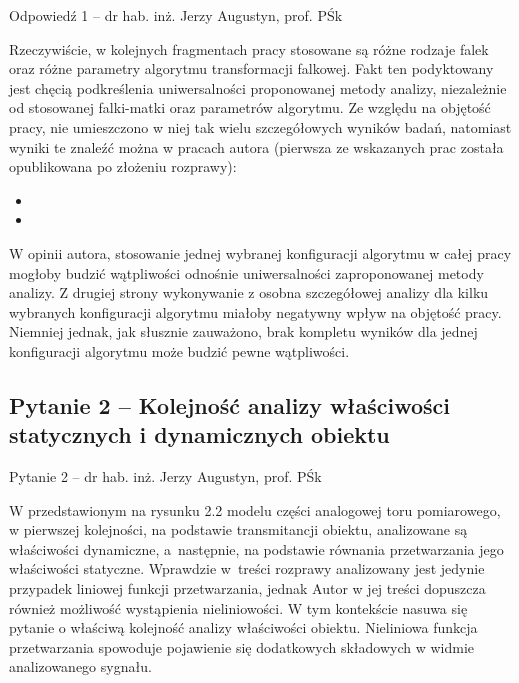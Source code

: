 \documentclass[12pt, polish, aspectratio = 169]{slides}
\begin{document}
\begin{frame}[allowframebreaks]{Odpowiedź 1 -- dr hab. inż. Jerzy Augustyn, prof. PŚk}\small
\begin{justify}
Rzeczywiście, w kolejnych fragmentach pracy stosowane są różne rodzaje falek oraz różne parametry algorytmu transformacji falkowej. Fakt ten podyktowany jest chęcią podkreślenia uniwersalności proponowanej metody analizy, niezależnie od stosowanej falki-matki oraz parametrów algorytmu. Ze względu na objętość pracy, nie umieszczono w niej tak wielu szczegółowych wyników badań, natomiast wyniki te znaleźć można w pracach autora (pierwsza ze wskazanych prac została opublikowana po złożeniu rozprawy):

\begin{itemize}
\item {}
\item {}
\end{itemize}

W opinii autora, stosowanie jednej wybranej konfiguracji algorytmu w całej pracy mogłoby budzić wątpliwości odnośnie uniwersalności zaproponowanej metody analizy. Z drugiej strony wykonywanie z osobna szczegółowej analizy dla kilku wybranych konfiguracji algorytmu miałoby negatywny wpływ na objętość pracy. Niemniej jednak, jak słusznie zauważono, brak kompletu wyników dla jednej konfiguracji algorytmu może budzić pewne wątpliwości.
\end{justify}
\end{frame}

\subsection{Pytanie 2 -- Kolejność analizy właściwości statycznych i dynamicznych obiektu}

\begin{frame}{Pytanie 2 -- dr hab. inż. Jerzy Augustyn, prof. PŚk}\large
\begin{justify}
W przedstawionym na rysunku 2.2 modelu części analogowej toru pomiarowego, w pierwszej kolejności, na podstawie transmitancji obiektu, analizowane są właściwości dynamiczne, a następnie, na podstawie równania przetwarzania jego właściwości statyczne. Wprawdzie w treści rozprawy analizowany jest jedynie przypadek liniowej funkcji przetwarzania, jednak Autor w jej treści dopuszcza również możliwość wystąpienia nieliniowości. W tym kontekście nasuwa się pytanie o właściwą kolejność analizy właściwości obiektu. Nieliniowa funkcja przetwarzania spowoduje pojawienie się dodatkowych składowych w widmie analizowanego sygnału.
\end{justify}
\end{frame}
\end{document}
